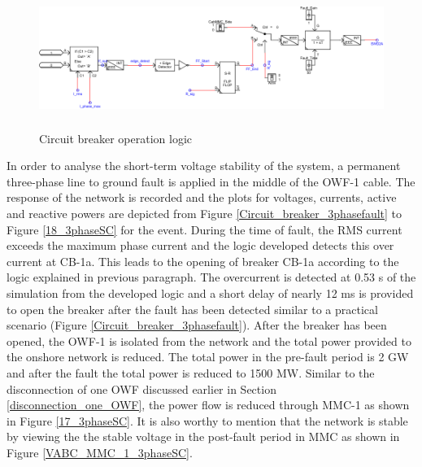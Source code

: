 \begin{figure}[H]
\centering
    \includegraphics[height = 4.5cm,width = 14.5cm]{Diagrams/Chapter_5/Fault_logic_New.pdf}
    \caption{Circuit breaker operation logic}
    \label{fig:Fault_logic}
\end{figure}

In order to analyse the short-term voltage stability of the system, a permanent three-phase line to ground fault is applied in the middle of the \gls{OWF}-1 cable. The response of the network is recorded and the plots for voltages, currents, active and reactive powers are depicted from Figure \ref{Circuit_breaker_3phasefault} to Figure \ref{18_3phaseSC} for the event. During the time of fault, the RMS current exceeds the maximum phase current and the logic developed detects this over current at CB-1a. This leads to the opening of breaker CB-1a according to the logic explained in previous paragraph. The overcurrent is detected at 0.53 s of the simulation from the developed logic and a short delay of nearly 12 ms is provided to open the breaker after the fault has been detected similar to a practical scenario (Figure \ref{Circuit_breaker_3phasefault}). After the breaker has been opened, the \gls{OWF}-1 is isolated from the network and the total power provided to the onshore network is reduced. The total power in the pre-fault period is 2 GW and after the fault the total power is reduced to 1500 MW. Similar to the disconnection of one \gls{OWF} discussed earlier in Section \ref{disconnection_one_OWF}, the power flow is reduced through \gls{MMC}-1 as shown in Figure \ref{17_3phaseSC}. It is also worthy to mention that the network is stable by viewing the the stable voltage in the post-fault period in \gls{MMC} as shown in Figure \ref{VABC_MMC_1_3phaseSC}.

